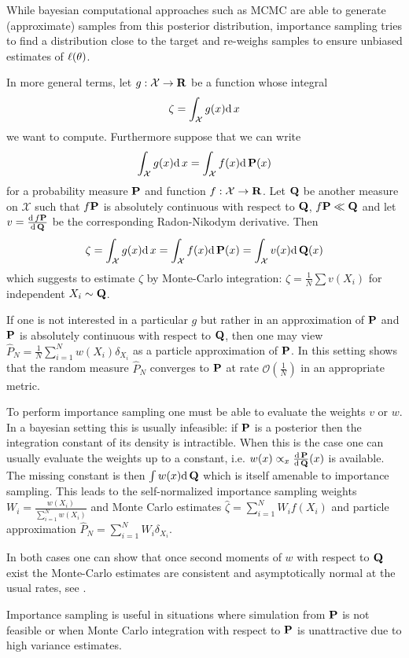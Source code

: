 While bayesian computational approaches such as MCMC are able to generate (approximate) samples from this posterior distribution, importance sampling tries to find a distribution close to the target and re-weighs samples to ensure unbiased estimates of $\lik(\theta)$.

In more general terms, let $g: \mathcal X \to \R$ be a function whose integral $$\zeta = \int_{\mathcal X} g(x) \d x$$ we want to compute. 
Furthermore suppose that we can write 
$$
    \int_{\mathcal X} g(x) \d x = \int_{\mathcal X} f(x) \d \P(x)
$$
for a probability measure $\P$ and function $f: \mathcal X \to \R$. 
Let $\Q$ be another measure on $\mathcal X$ such that $f\P$ is absolutely continuous with respect to $\Q$, $f\P \ll \Q$ and let $v = \frac{\d f\P}{\d\Q}$ be the corresponding Radon-Nikodym derivative. Then 
$$
\zeta = \int_{\mathcal X} g(x) \d x = \int_{\mathcal X} f(x) \d \P(x) = \int_{\mathcal X} v(x)\d\Q(x)
$$
which suggests to estimate $\zeta$ by Monte-Carlo integration: $\hat \zeta = \frac 1 N \sum v(X_i)$ for independent $X_i \sim \Q$. 

If one is not interested in a particular $g$ but rather in an approximation of $\P$ and $\P$ is absolutely continuous with respect to $\Q$, then one may view $\hat P_N = \frac{1}{N} \sum_{i = 1}^{N} w(X_i) \delta_{X_i}$ as a particle approximation of $\P$. In this setting \cite{Agapiou2017Importance} shows that the random measure $\hat P_N$ converges to $\P$ at rate $\mathcal O\left(\frac 1 N\right)$ in an appropriate metric. 

To perform importance sampling one must be able to evaluate the weights $v$ or $w$. In a bayesian setting this is usually infeasible: if $\P$ is a posterior then the integration constant of its density is intractible. 
When this is the case one can usually evaluate the weights up to a constant, i.e. $w(x) \propto_x \frac{\d \P}{\d \Q}(x)$ is available. The missing constant is then $\int w(x) \d \Q$ which is itself amenable to importance sampling.
This leads to the self-normalized importance sampling weights $W_i = \frac{w(X_i)}{\sum_{i = 1}^N w(X_i)}$ and Monte Carlo estimates $\hat \zeta = \sum_{i = 1}^{N} W_i f(X_i)$ and particle approximation $\hat P_N = \sum_{i = 1}^{N} W_i \delta_{X_i}$.

In both cases one can show that once second moments of $w$ with respect to $\Q$ exist the Monte-Carlo estimates are consistent and asymptotically normal at the usual rates, see \cite[Chapter 8]{Chopin2020Introduction}. 

Importance sampling is useful in situations where simulation from $\P$ is not feasible or when Monte Carlo integration with respect to $\P$ is unattractive due to high variance estimates. 
